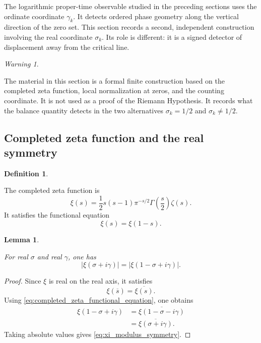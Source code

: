 \documentclass[11pt]{amsart}
\numberwithin{equation}{section}
\theoremstyle{plain}
\newtheorem{lemma}[theorem]{Lemma}
\theoremstyle{definition}
\newtheorem{definition}[theorem]{Definition}
\theoremstyle{remark}
\newtheorem{warning}[theorem]{Warning}
\begin{document}
The logarithmic proper-time observable studied in the preceding sections uses the ordinate coordinate \(\gamma_k\).  It detects ordered phase geometry along the vertical direction of the zero set.  This section records a second, independent construction involving the real coordinate \(\sigma_k\).  Its role is different: it is a signed detector of displacement away from the critical line.

\begin{warning}
\label{warn:dx_status}

The material in this section is a formal finite construction based on the completed zeta function, local normalization at zeros, and the counting coordinate.  It is not used as a proof of the Riemann Hypothesis.  It records what the balance quantity detects in the two alternatives \(\sigma_k=1/2\) and \(\sigma_k\neq1/2\).

\end{warning}

\subsection{Completed zeta function and the real symmetry}
\label{subsec:completed_zeta_real_symmetry}

\begin{definition}
\label{def:completed_zeta_xi}

The completed zeta function is
\begin{equation}
\xi(s)
=
\frac{1}{2}s(s-1)\pi^{-s/2}\Gamma\left(\frac{s}{2}\right)\zeta(s).
\label{eq:completed_zeta_xi}
\end{equation}
It satisfies the functional equation
\begin{equation}
\xi(s)=\xi(1-s).
\label{eq:completed_zeta_functional_equation}
\end{equation}

\end{definition}

\begin{lemma}
\label{lem:xi_modulus_symmetry}

For real \(\sigma\) and real \(\gamma\), one has
\begin{equation}
|\xi(\sigma+i\gamma)|
=
|\xi(1-\sigma+i\gamma)|.
\label{eq:xi_modulus_symmetry}
\end{equation}

\end{lemma}

\begin{proof}
Since \(\xi\) is real on the real axis, it satisfies
\begin{equation}
\xi(\overline{s})=\overline{\xi(s)}.
\label{eq:xi_real_on_real_axis_symmetry}
\end{equation}
Using \eqref{eq:completed_zeta_functional_equation}, one obtains
\begin{align}
\xi(1-\sigma+i\gamma)
&=
\overline{\xi(1-\sigma-i\gamma)}
\label{eq:xi_modulus_symmetry_proof_first}
\\
&=
\overline{\xi(\sigma+i\gamma)}.
\label{eq:xi_modulus_symmetry_proof_second}
\end{align}
Taking absolute values gives \eqref{eq:xi_modulus_symmetry}.
\end{proof}
\end{document}
